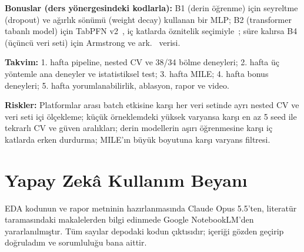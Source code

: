 \documentclass[conference]{IEEEtran}
\begin{document}
\textbf{Bonuslar (ders yönergesindeki kodlarla):} B1 (derin öğrenme) için seyreltme (dropout) ve ağırlık sönümü (weight decay) kullanan bir MLP; B2 (transformer tabanlı model) için TabPFN v2~\cite{hollmann2025}, iç katlarda öznitelik seçimiyle~\cite{zhou2025}; süre kalırsa B4 (üçüncü veri seti) için Armstrong ve ark.~\cite{armstrong2002} verisi.

\textbf{Takvim:} 1. hafta pipeline, nested CV ve 38/34 bölme deneyleri; 2. hafta üç yöntemle ana deneyler ve istatistiksel test; 3. hafta MILE; 4. hafta bonus deneyleri; 5. hafta yorumlanabilirlik, ablasyon, rapor ve video.

\textbf{Riskler:} Platformlar arası batch etkisine karşı her veri setinde ayrı nested CV ve veri seti içi ölçekleme; küçük örneklemdeki yüksek varyansa karşı en az 5 seed ile tekrarlı CV ve güven aralıkları; derin modellerin aşırı öğrenmesine karşı iç katlarda erken durdurma; MILE'ın büyük boyutuna karşı varyans filtresi.

\section*{Yapay Zekâ Kullanım Beyanı}
EDA kodunun ve rapor metninin hazırlanmasında Claude Opus 5.5'ten, literatür taramasındaki makalelerden bilgi edinmede Google NotebookLM'den yararlanılmıştır. Tüm sayılar depodaki kodun çıktısıdır; içeriği gözden geçirip doğruladım ve sorumluluğu bana aittir.
\end{document}
